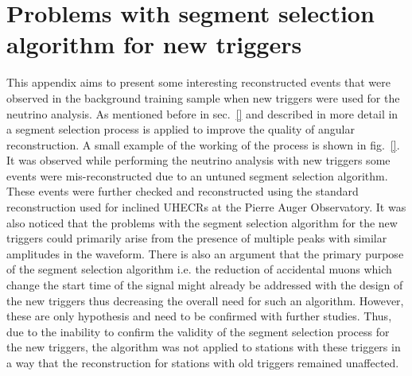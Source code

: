 \chapter{Problems with segment selection algorithm for new triggers} 
\label{sec:app_3}

This appendix aims to present some interesting reconstructed events that were observed in the background training sample when new triggers were used for the neutrino analysis. As mentioned before in sec.~\ref{} and described in more detail in~\cite{} a segment selection process is applied to improve the quality of angular reconstruction. A small example of the working of the process is shown in fig.~\ref{}. It was observed while performing the neutrino analysis with new triggers some events were mis-reconstructed due to an untuned segment selection algorithm. These events were further checked and reconstructed using the standard reconstruction used for inclined UHECRs at the Pierre Auger Observatory. It was also noticed that the problems with the segment selection algorithm for the new triggers could primarily arise from the presence of multiple peaks with similar amplitudes in the waveform. There is also an argument that the primary purpose of the segment selection algorithm i.e. the reduction of accidental muons which change the start time of the signal might already be addressed with the design of the new triggers thus decreasing the overall need for such an algorithm. However, these are only hypothesis and need to be confirmed with further studies. Thus, due to the inability to confirm the validity of the segment selection process for the new triggers, the algorithm was not applied to stations with these triggers in a way that the reconstruction for stations with old triggers remained unaffected. 


